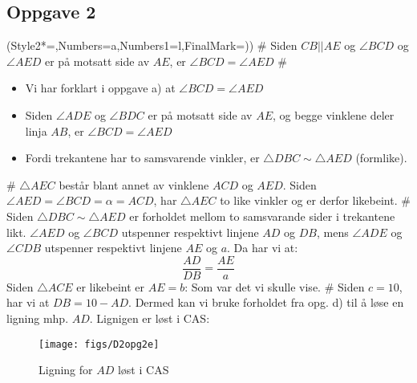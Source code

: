 \subsection*{Oppgave 2}
\begin{easylist}[enumerate]
	\ListProperties(Style2*=,Numbers=a,Numbers1=l,FinalMark={)})
	#  Siden $ CB|| AE $ og $ \angle BCD $ og $ \angle AED $ er på motsatt side av $ AE $, er $ \angle BCD = \angle AED $ 
	# \begin{itemize}
		\item Vi har forklart i oppgave a) at $  \angle BCD = \angle AED$
		\item Siden $ \angle ADE $ og $ \angle BDC $ er på motsatt side av $ AE $, og begge vinklene deler linja $ AB $, er $ \angle BCD = \angle AED $ 
		\item Fordi trekantene har to samsvarende vinkler, er $ \triangle DBC \sim \triangle AED $ (formlike).
	\end{itemize}
	# $ \triangle AEC $ består blant annet av vinklene $ ACD $ og $ AED. $ Siden $ \angle AED = \angle BCD = \alpha = ACD $, har $ \triangle AEC $ to like vinkler og er derfor likebeint.
	# Siden $ \triangle DBC \sim \triangle AED $ er forholdet mellom to samsvarande sider i trekantene likt. $ \angle AED$ og $ \angle BCD $ utspenner respektivt linjene $ AD $ og $ DB $, mens $ \angle ADE$ og $ \angle CDB $ utspenner respektivt linjene $ AE $ og $ a$. Da har vi at:
	\[ \frac{AD}{DB}= \frac{AE}{a}\]
	Siden $ \triangle ACE $ er likebeint er $ AE=b $:
Som var det vi skulle vise.
	# Siden $ c=10 $, har vi at $ DB=10-AD $. Dermed kan vi bruke forholdet fra opg. d) til å løse en ligning mhp. $ AD $. Lignigen er løst i CAS:
	\begin{figure}[h]
		\centering
		\texttt{[image: figs/D2opg2e]}
		\caption{Ligning for $ AD $ løst i CAS}
	\end{figure}
\end{easylist}



